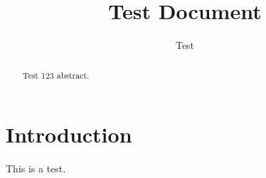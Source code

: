 \documentclass[conference]{IEEEtran}
\newcommand{\nexact}[1]{#1}
\begin{document}
\title{Test Document}
\author{Test}
\maketitle

\begin{abstract}
Test \nexact{123} abstract.
\end{abstract}

\section{Introduction}
This is a test.
\end{document}
